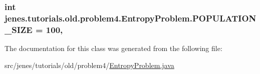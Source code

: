 \hypertarget{classjenes_1_1tutorials_1_1old_1_1problem4_1_1_entropy_problem_a8b85592ca8d79e8511f8881f9b21d339}{
\subsubsection[{P\-O\-P\-U\-L\-A\-T\-I\-O\-N\-\_\-\-S\-I\-Z\-E}]{\setlength{\rightskip}{0pt plus 5cm}int jenes.\-tutorials.\-old.\-problem4.\-Entropy\-Problem.\-P\-O\-P\-U\-L\-A\-T\-I\-O\-N\-\_\-\-S\-I\-Z\-E = 100\hspace{0.3cm}{\ttfamily [static]}, {\ttfamily [private]}}}\label{classjenes_1_1tutorials_1_1old_1_1problem4_1_1_entropy_problem_a8b85592ca8d79e8511f8881f9b21d339}


The documentation for this class was generated from the following file\-:\begin{DoxyCompactItemize}
\item 
src/jenes/tutorials/old/problem4/\hyperlink{old_2problem4_2_entropy_problem_8java}{Entropy\-Problem.\-java}\end{DoxyCompactItemize}
